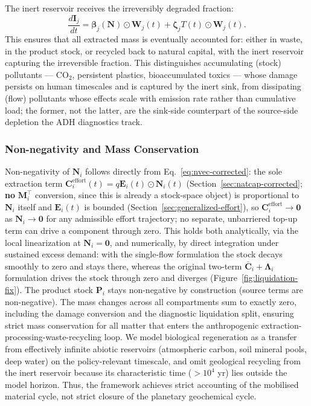 \documentclass[twocolumn,10pt]{article}
\begin{document}
The inert reservoir receives the irreversibly degraded fraction:
\begin{equation}
\frac{d\mathbf{I}_j}{dt} = \boldsymbol{\beta}_j(\mathbf{N}) \odot \mathbf{W}_j(t)
   + \boldsymbol{\zeta}_j T(t) \odot \mathbf{W}_j(t).
\label{eq:ivec}
\end{equation}
This ensures that all extracted mass is eventually accounted for: either in waste, in the product stock, or recycled back to natural capital, with the inert reservoir capturing the irreversible fraction. This distinguishes accumulating (stock) pollutants --- CO\(_2\), persistent plastics, bioaccumulated toxics --- whose damage persists on human timescales and is captured by the inert sink, from dissipating (flow) pollutants whose effects scale with emission rate rather than cumulative load; the former, not the latter, are the sink-side counterpart of the source-side depletion the ADH diagnostics track.

\subsubsection{Non-negativity and Mass Conservation}
\label{sec:nonneg-corrected}
Non-negativity of \(\mathbf{N}_i\) follows directly from Eq.~\eqref{eq:nvec-corrected}: the sole extraction term $\mathbf C_i^{\text{effort}}(t)=q\mathbf E_i(t)\odot\mathbf N_i(t)$ (Section~\ref{sec:natcap-corrected}; \textbf{no} $\mathbf M_i^\top$ conversion, since this is already a stock-space object) is proportional to $\mathbf N_i$ itself and $\mathbf E_i(t)$ is bounded (Section~\ref{sec:generalized-effort}), so $\mathbf C_i^{\text{effort}}\to\mathbf 0$ as $\mathbf N_i\to\mathbf 0$ for any admissible effort trajectory; no separate, unbarriered top-up term can drive a component through zero. This holds both analytically, via the local linearization at $\mathbf N_i=\mathbf 0$, and numerically, by direct integration under sustained excess demand: with the single-flow formulation the stock decays smoothly to zero and stays there, whereas the original two-term $\bar{\mathbf C}_i+\boldsymbol\Lambda_i$ formulation drives the stock through zero and diverges (Figure~\ref{fig:liquidation-fix}). The product stock \(\mathbf{P}_i\) stays non-negative by construction (source terms are non-negative). The mass changes across all compartments sum to exactly zero, including the damage conversion and the diagnostic liquidation split, ensuring strict mass conservation for all matter that enters the anthropogenic extraction-processing-waste-recycling loop. We model biological regeneration as a transfer from effectively infinite abiotic reservoirs (atmospheric carbon, soil mineral pools, deep water) on the policy-relevant timescale, and omit geological recycling from the inert reservoir because its characteristic time (\(>10^4\) yr) lies outside the model horizon. Thus, the framework achieves strict accounting of the mobilised material cycle, not strict closure of the planetary geochemical cycle.
\end{document}
